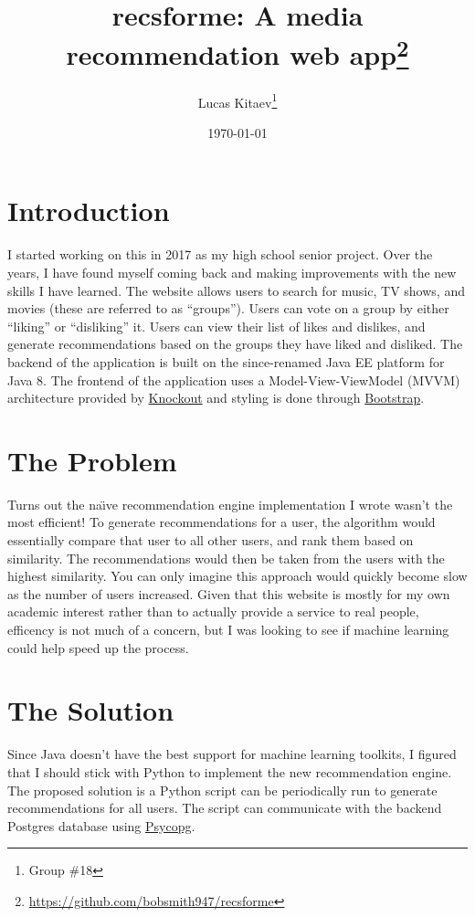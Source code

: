 \documentclass[12pt]{article}
\title{recsforme: A media recommendation web app\thanks{\url{https://github.com/bobsmith947/recsforme}}}
\author{Lucas Kitaev\thanks{Group \#18}}
\date{\today}
\begin{document}
	\maketitle

	\section*{Introduction}
	I started working on this in 2017 as my high school senior project. Over the years, I have found myself coming back and making improvements with the new skills I have learned. The website allows users to search for music, TV shows, and movies (these are referred to as ``groups''). Users can vote on a group by either ``liking'' or ``disliking'' it. Users can view their list of likes and dislikes, and generate recommendations based on the groups they have liked and disliked. The backend of the application is built on the since-renamed Java EE platform for Java 8. The frontend of the application uses a Model-View-ViewModel (MVVM) architecture provided by \href{https://knockoutjs.com/}{Knockout} and styling is done through \href{https://getbootstrap.com/}{Bootstrap}.

	\section*{The Problem}
	Turns out the na\"{\i}ve recommendation engine implementation I wrote wasn't the most efficient! To generate recommendations for a user, the algorithm would essentially compare that user to all other users, and rank them based on similarity. The recommendations would then be taken from the users with the highest similarity. You can only imagine this approach would quickly become slow as the number of users increased. Given that this website is mostly for my own academic interest rather than to actually provide a service to real people, efficency is not much of a concern, but I was looking to see if machine learning could help speed up the process.

	\newpage

	\section*{The Solution}
	Since Java doesn't have the best support for machine learning toolkits, I figured that I should stick with Python to implement the new recommendation engine. The proposed solution is a Python script can be periodically run to generate recommendations for all users. The script can communicate with the backend Postgres database using \href{https://www.psycopg.org/}{Psycopg}.
\end{document}
